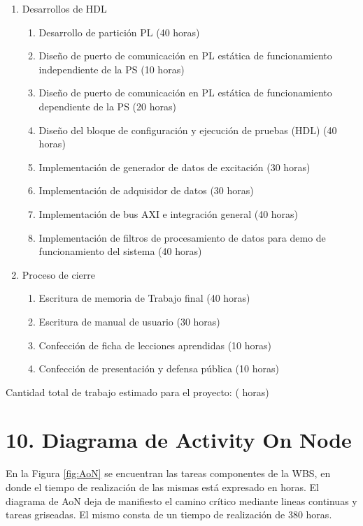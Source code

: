 \documentclass[
11pt, %
]{charter}
\begin{document}
\begin{enumerate}
	\item Desarrollos de HDL
	\begin{enumerate}
		\item Desarrollo de partición PL (40 horas)		
		\item Diseño de puerto de comunicación en PL estática de funcionamiento independiente de la PS (10 horas)
		\item Diseño de puerto de comunicación en PL estática de funcionamiento dependiente de la PS (20 horas)
		\item Diseño del bloque de configuración y ejecución de pruebas (HDL) (40 horas)
		\item Implementación de generador de datos de excitación (30 horas)
		\item Implementación de adquisidor de datos (30 horas)
		\item Implementación de bus AXI e integración general (40 horas)
		\item Implementación de filtros de procesamiento de datos para demo de funcionamiento del sistema (40 horas)
	\end{enumerate}
	
	\item Proceso de cierre
	\begin{enumerate}
		\item Escritura de memoria de Trabajo final (40 horas)
		\item Escritura de manual de usuario (30 horas)
		\item Confección de ficha de lecciones aprendidas (10 horas)
		\item Confección de presentación y defensa pública (10 horas)
	\end{enumerate}	
	
\end{enumerate}

Cantidad total de trabajo estimado para el proyecto: ({\projecteffort} horas)

\clearpage

\section{10. Diagrama de Activity On Node}
\label{sec:AoN}

En la Figura \ref{fig:AoN} se encuentran las tareas componentes de la WBS, en donde el tiempo de realización de las mismas está expresado en horas. El diagrama de AoN deja de manifiesto el camino crítico mediante lineas continuas y tareas griseadas. El mismo consta de un tiempo de realización de 380 horas.
\end{document}
